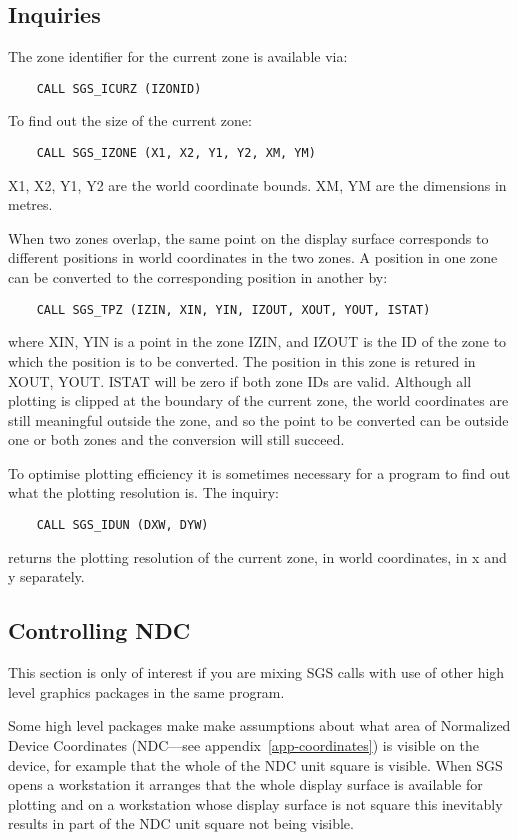 \subsection {Inquiries}

The zone identifier for the current zone is available via:
\begin{verbatim}
    CALL SGS_ICURZ (IZONID)
\end{verbatim}
To find out the size of the current zone:
\begin{verbatim}
    CALL SGS_IZONE (X1, X2, Y1, Y2, XM, YM)
\end{verbatim}
X1, X2, Y1, Y2 are the world coordinate bounds.  XM, YM
are the dimensions in metres.

When two zones overlap, the same point on the display surface corresponds to
different positions in world coordinates in the two zones. A position in one
zone can be converted to the corresponding position in another by:
\begin{verbatim}
    CALL SGS_TPZ (IZIN, XIN, YIN, IZOUT, XOUT, YOUT, ISTAT)
\end{verbatim}
where XIN, YIN is a point in the zone IZIN, and IZOUT is the ID of the zone to
which the position is to be converted.  The position in this zone is retured
in XOUT, YOUT. ISTAT will be zero if both zone IDs are valid.  Although all
plotting is clipped at the boundary of the current zone, the world coordinates
are still meaningful outside the zone, and so the point to be converted can 
be outside one or both zones and the conversion will still succeed.

To optimise plotting efficiency it is sometimes
necessary for a program to find out what the
plotting resolution is.  The inquiry:
\begin{verbatim}
    CALL SGS_IDUN (DXW, DYW)
\end{verbatim}
returns the plotting resolution of the current zone, in
world coordinates, in x and y separately.

\subsection {Controlling NDC}

This section is only of interest if you are mixing SGS calls with use of other
high level graphics packages in the same program. 

Some high level packages make make assumptions about what area of Normalized
Device Coordinates (NDC---see appendix~\ref{app-coordinates}) is visible on the
device, for example that the whole of the NDC unit square is visible. When SGS
opens a workstation it arranges that the whole display surface is available for
plotting and on a workstation whose display surface is not square  this
inevitably results in part of the NDC unit square not being visible. 

